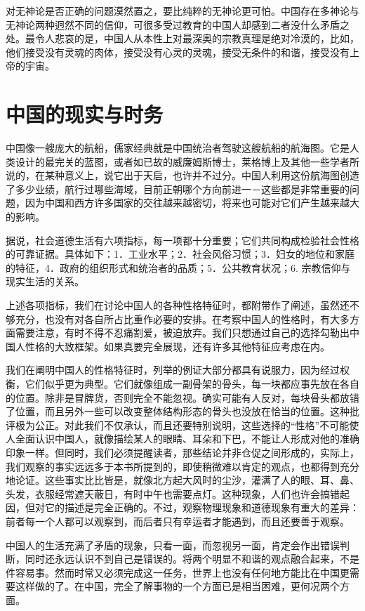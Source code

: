 \documentclass[12pt,oneside]{book}
\begin{document}
\begin{common-format}
对无神论是否正确的问题漠然置之，要比纯粹的无神论更可怕。中国存在多神论与无神论两种迥然不同的信仰，可很多受过教育的中国人却感到二者没什么矛盾之处。最令人悲哀的是，中国人从本性上对最深奥的宗教真理是绝对冷漠的，比如，他们接受没有灵魂的肉体，接受没有心灵的灵魂，接受无条件的和谐，接受没有上帝的宇宙。 

\chapter{中国的现实与时务}
中国像一艘庞大的航船，儒家经典就是中国统治者驾驶这艘航船的航海图。它是人类设计的最完关的蓝图，或者如已故的威廉姆斯博士，莱格博上及其他一些学者所说的，在某种意义上，说它出于天启，也许并不过分。中国人利用这份航海图创造了多少业绩，航行过哪些海域，目前正朝哪个方向前进一－这些都是非常重要的问题，因为中国和西方许多国家的交往越来越密切，将来也可能对它们产生越来越大的影响。 

据说，社会道德生活有六项指标，每一项都十分重要；它们共同构成检验社会性格的可靠证据。具体如下：1．工业水平；2．社会风俗习惯；3．妇女的地位和家庭的特征，4．政府的组织形式和统治者的品质；5．公共教育状况；6. 宗教信仰与现实生活的关系。 

上述各项指标，我们在讨论中国人的各种性格特征时，都附带作了阐述，虽然还不够充分，也没有对各自所占比重作必要的安排。在考察中国人的性格时，有大多方面需要注意，有时不得不忍痛割爱，被迫放弃。我们只想通过自己的选择勾勒出中国人性格的大致框架。如果真要完全展现，还有许多其他特征应考虑在内。 

我们在阐明中国人的性格特征时，列举的例证大部分都具有说服力，因为经过权衡，它们似乎更为典型。它们就像组成一副骨架的骨头，每一块都应事先放在各自的位置。除非是冒牌货，否则完全不能忽视。确实可能有人反对，每块骨头都放错了位置，而且另外一些可以改变整体结构形态的骨头也没放在恰当的位置。这种批评极为公正。对此我们不仅承认，而且还要特别说明，这些选择的“性格”不可能使人全面认识中国人，就像描绘某人的眼睛、耳朵和下巴，不能让人形成对他的准确印象一样。但同时，我们必须提醒读者，那些结论并非仓促之间形成的，实际上，我们观察的事实远远多于本书所提到的，即使稍微难以肯定的观点，也都得到充分地论证。这些事实比比皆是，就像北方起大风时的尘沙，灌满了人的眼、耳、鼻、头发，衣服经常遮天蔽日，有时中午也需要点灯。这种现象，人们也许会搞错起因，但对它的描述是完全正确的。不过，观察物理现象和道德现象有重大的差异：前者每一个人都可以观察到，而后者只有幸运者才能遇到，而且还要善于观察。 

中国人的生活充满了矛盾的现象，只看一面，而忽视另一面，肯定会作出错误判断，同时还永远认识不到自己是错误的。将两个明显不和谐的观点融合起来，不是件容易事。然而时常又必须完成这一任务，世界上也没有任何地方能比在中国更需要这样做的了。在中国，完全了解事物的一个方面已是相当困难，更何况两个方面。 


\end{common-format}
\end{document}
